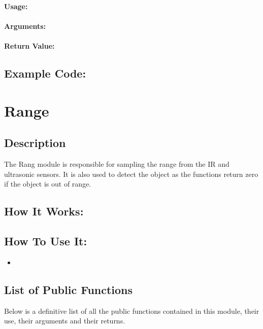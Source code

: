 \documentclass[]{report}
\begin{document}
\subsection{}
\subsubsection{Usage:}

\subsubsection{Arguments:}

\subsubsection{Return Value:}

\section{Example Code:}

\chapter{Range}
\section{Description}
The Rang module is responsible for sampling the range from the IR and ultrasonic sensors. It is also used to detect the object as the functions return zero if the object is out of range.

\section{How It Works:}

\section{How To Use It:}
\begin{itemize}
	\item 
\end{itemize}

\section{List of Public Functions}
Below is a definitive list of all the public functions contained in this module, their use, their arguments and their returns.
\end{document}
